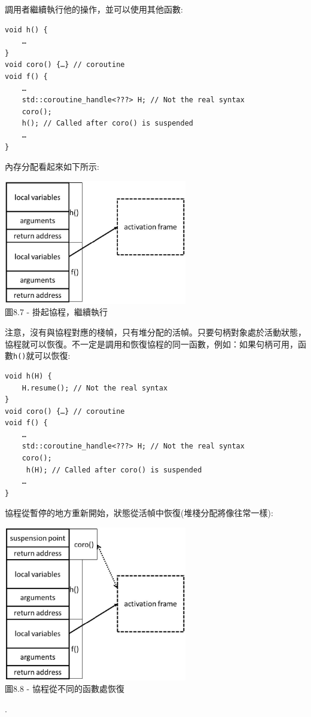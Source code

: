 調用者繼續執行他的操作，並可以使用其他函數:

\begin{lstlisting}[style=styleCXX]
void h() {
	…
}
void coro() {…} // coroutine
void f() {
	…
	std::coroutine_handle<???> H; // Not the real syntax
	coro();
	h(); // Called after coro() is suspended
	…
}
\end{lstlisting}

內存分配看起來如下所示:

\begin{center}
\includegraphics[width=0.6\textwidth]{content/2/chapter8/images/7.jpg}\\
圖8.7 - 掛起協程，繼續執行
\end{center}

注意，沒有與協程對應的棧幀，只有堆分配的活幀。只要句柄對象處於活動狀態，協程就可以恢復。不一定是調用和恢復協程的同一函數，例如：如果句柄可用，函數\texttt{h()}就可以恢復:

\begin{lstlisting}[style=styleCXX]
void h(H) {
	H.resume(); // Not the real syntax
}
void coro() {…} // coroutine
void f() {
	…
	std::coroutine_handle<???> H; // Not the real syntax
	coro();
	 h(H); // Called after coro() is suspended
	…
}
\end{lstlisting}

協程從暫停的地方重新開始，狀態從活幀中恢復(堆棧分配將像往常一樣):

\begin{center}
\includegraphics[width=0.6\textwidth]{content/2/chapter8/images/8.jpg}\\
圖8.8 - 協程從不同的函數處恢復
\end{center}.

